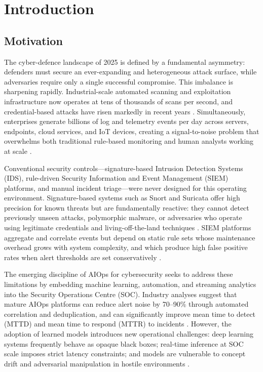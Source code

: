 \documentclass[12pt,a4paper]{report}
\begin{document}
\chapter{Introduction}
\label{ch:introduction}

\section{Motivation}
\label{sec:motivation}

The cyber-defence landscape of 2025 is defined by a fundamental asymmetry: defenders must secure an ever-expanding and heterogeneous attack surface, while adversaries require only a single successful compromise. This imbalance is sharpening rapidly. Industrial-scale automated scanning and exploitation infrastructure now operates at tens of thousands of scans per second, and credential-based attacks have risen markedly in recent years \citep{fortinet2025}. Simultaneously, enterprises generate billions of log and telemetry events per day across servers, endpoints, cloud services, and IoT devices, creating a signal-to-noise problem that overwhelms both traditional rule-based monitoring and human analysts working at scale \citep{dang2023}.

Conventional security controls---signature-based Intrusion Detection Systems (IDS), rule-driven Security Information and Event Management (SIEM) platforms, and manual incident triage---were never designed for this operating environment. Signature-based systems such as Snort and Suricata offer high precision for known threats but are fundamentally reactive: they cannot detect previously unseen attacks, polymorphic malware, or adversaries who operate using legitimate credentials and living-off-the-land techniques \citep{ahmad2021}. SIEM platforms aggregate and correlate events but depend on static rule sets whose maintenance overhead grows with system complexity, and which produce high false positive rates when alert thresholds are set conservatively \citep{zhu2023}.

The emerging discipline of AIOps for cybersecurity seeks to address these limitations by embedding machine learning, automation, and streaming analytics into the Security Operations Centre (SOC). Industry analyses suggest that mature AIOps platforms can reduce alert noise by 70--90\% through automated correlation and deduplication, and can significantly improve mean time to detect (MTTD) and mean time to respond (MTTR) to incidents \citep{dang2023,nguyen2024}. However, the adoption of learned models introduces new operational challenges: deep learning systems frequently behave as opaque black boxes; real-time inference at SOC scale imposes strict latency constraints; and models are vulnerable to concept drift and adversarial manipulation in hostile environments \citep{schwarzschild2021,goldblum2023}.
\end{document}
